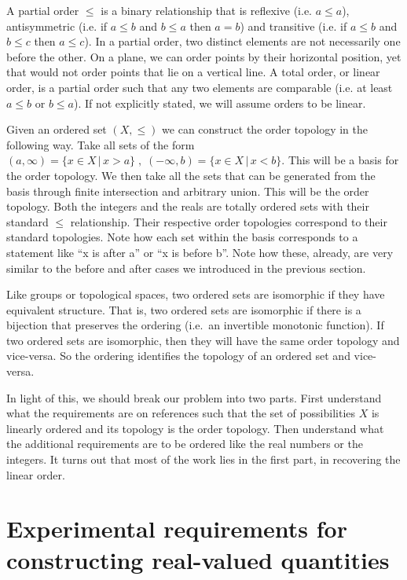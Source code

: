 \documentclass[12pt]{iopart}
\begin{document}
A partial order $\leq$ is a binary relationship that is reflexive (i.e. $a \leq a$), antisymmetric (i.e. if $a\leq b$ and $b \leq a$ then $a = b$) and transitive (i.e. if $a \leq b$ and $b \leq c$ then $a \leq c$). In a partial order, two distinct elements are not necessarily one before the other. On a plane, we can order points by their horizontal position, yet that would not order points that lie on a vertical line. A total order, or linear order, is a partial order such that any two elements are comparable (i.e. at least $a \leq b$ or $b \leq a$). If not explicitly stated, we will assume orders to be linear.

Given an ordered set $(X, \leq)$ we can construct the order topology in the following way. Take all sets of the form $(a, \infty) = \{x \in X \, | \, x > a\} \;,\; (-\infty, b) = \{x \in X \, | \, x < b\}$. This will be a basis for the order topology. We then take all the sets that can be generated from the basis through finite intersection and arbitrary union. This will be the order topology. Both the integers and the reals are totally ordered sets with their standard $\leq$ relationship. Their respective order topologies correspond to their standard topologies. Note how each set within the basis corresponds to a statement like ``x is after a'' or ``x is before b''. Note how these, already, are very similar to the before and after cases we introduced in the previous section.

Like groups or topological spaces, two ordered sets are isomorphic if they have equivalent structure. That is, two ordered sets are isomorphic if there is a bijection that preserves the ordering (i.e.~an invertible monotonic function). If two ordered sets are isomorphic, then they will have the same order topology and vice-versa. So the ordering identifies the topology of an ordered set and vice-versa.

In light of this, we should break our problem into two parts. First understand what the requirements are on references such that the set of possibilities $X$ is linearly ordered and its topology is the order topology. Then understand what the additional requirements are to be ordered like the real numbers or the integers. It turns out that most of the work lies in the first part, in recovering the linear order.

\section{Experimental requirements for constructing real-valued quantities}
\end{document}
